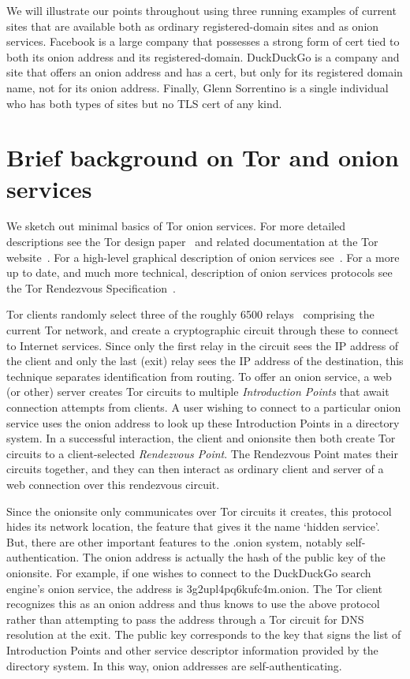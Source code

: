\documentclass[10pt, conference, compsocconf]{styles/IEEEtran}
\begin{document}
We will illustrate our points throughout using three running examples
of current sites that are available both as ordinary registered-domain
sites and as onion services. Facebook is a large company that
possesses a strong form of cert tied to both its onion address and its
registered-domain. DuckDuckGo is a company and site that offers an
onion address and has a cert, but only for its registered domain name,
not for its onion address.  Finally, Glenn Sorrentino is a single
individual who has both types of sites but no TLS cert of any kind.

\section{Brief background on Tor and onion services}

We sketch out minimal basics of Tor onion services. For more detailed
descriptions see the Tor design paper~\cite{tor-design} and related documentation at the
Tor website~\cite{torproject}. For a high-level graphical description
of onion services see~\cite{tor-hs}. For a more up to date, and much
more technical, description of onion services protocols see the Tor
Rendezvous Specification~\cite{tor-rend-spec}.

Tor clients randomly select three of the roughly 6500 relays~\cite{tor-network-size}
comprising the current Tor network, and create a cryptographic circuit
through these to connect to Internet services. Since only the first
relay in the circuit sees the IP address of the client and
only the last (exit) relay sees the IP address of the destination,
this technique separates identification from routing.
To offer an onion service, a web (or other) server creates Tor circuits to
multiple \emph{Introduction Points} that await connection attempts
from clients. A user wishing to connect to a particular onion service
uses the onion address to look up these Introduction Points in a
directory system. In a successful interaction, the client and
onionsite then both create Tor circuits to a client-selected
\emph{Rendezvous Point}. The Rendezvous Point mates their circuits
together, and they can then interact as ordinary client and server of
a web connection over this rendezvous circuit.

Since the onionsite only communicates over Tor circuits it creates,
this protocol hides its network location, the feature that
gives it the name `hidden service'. But, there are other important
features to the .onion system, notably self-authentication. The onion
address is actually the hash of the public key of the onionsite. For
example, if one wishes to connect to the DuckDuckGo search engine's
onion service, the address is 3g2upl4pq6kufc4m.onion. The Tor client
recognizes this as an onion address and thus knows to use the above
protocol rather than attempting to pass the address through a Tor
circuit for DNS resolution at the exit. The public key
corresponds to the key that signs the list of Introduction Points
and other service descriptor information provided by the directory
system. In this way, onion addresses are self-authenticating.
\end{document}
